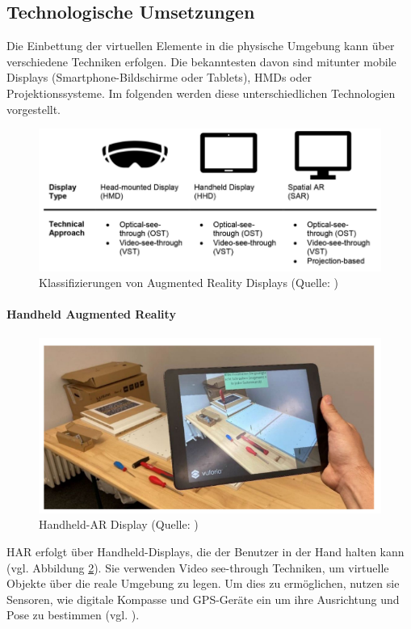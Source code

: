 \subsection{Technologische Umsetzungen}
Die Einbettung der virtuellen Elemente in die physische Umgebung kann über verschiedene Techniken erfolgen. Die bekanntesten davon sind mitunter mobile Displays (Smartphone-Bildschirme oder Tablets), \ac{HMD}s oder Projektionssysteme. Im folgenden werden diese unterschiedlichen Technologien vorgestellt.
\begin{figure}[ht]
\centering
\includegraphics[width=1\linewidth]{content/pictures/devices.PNG}
\caption{Klassifizierungen von Augmented Reality Displays (Quelle: \citealp[S. 315]{leins_comparing_2024})}
\label{fig:ar-classes}
\end{figure}
\paragraph{Handheld Augmented Reality}
\begin{figure}[ht]
\centering
\includegraphics[width=0.5\linewidth]{content/pictures/handheld-ar.PNG}
\caption{Handheld-AR Display (Quelle: \citealp[S. 318]{leins_comparing_2024})}
\label{fig:handheld-ar}
\end{figure}

\ac{HAR} erfolgt über Handheld-Displays, die der Benutzer in der Hand halten kann (vgl. Abbildung \ref{fig:handheld-ar}). Sie verwenden Video see-through Techniken, um virtuelle Objekte über die reale Umgebung zu legen. Um dies zu ermöglichen, nutzen sie Sensoren, wie digitale Kompasse und GPS-Geräte ein um ihre Ausrichtung und Pose zu bestimmen (vgl. \citealp[S. 347]{carmigniani_augmented_2011}).

